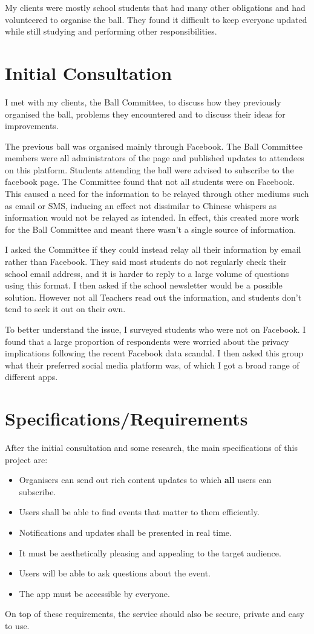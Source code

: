 \documentclass[a4paper,oneside,12pt]{report}
\begin{document}
    My clients were mostly school students that had many other obligations and had volunteered to organise the ball. They found it difficult to keep everyone updated while still studying and performing other responsibilities.

	\section{Initial Consultation}
	I met with my clients, the Ball Committee, to discuss how they previously organised the ball, problems they encountered and to discuss their ideas for improvements.

    The previous ball was organised mainly through Facebook. The Ball Committee members were all administrators of the page and published updates to attendees on this platform. Students attending the ball were advised to subscribe to the facebook page. The Committee found that not all students were on Facebook. This caused a need for the information to be relayed through other mediums such as email or SMS, inducing an effect not dissimilar to Chinese whispers as information would not be relayed as intended. In effect, this created more work for the Ball Committee and meant there wasn't a single source of information.

    I asked the Committee if they could instead relay all their information by email rather than Facebook. They said most students do not regularly check their school email address, and it is harder to reply to a large volume of questions using this format. I then asked if the school newsletter would be a possible solution. However not all Teachers read out the information, and students don't tend to seek it out on their own.

    To better understand the issue, I surveyed students who were not on Facebook. I found that a large proportion of respondents were worried about the privacy implications following the recent Facebook data scandal. I then asked this group what their preferred social media platform was, of which I got a broad range of different apps.

	\section{Specifications/Requirements}
	After the initial consultation and some research, the main specifications of this project are:
	\begin{itemize}
		\item Organisers can send out rich content updates to which \textbf{all} users can subscribe.
		\item Users shall be able to find events that matter to them efficiently.
		\item Notifications and updates shall be presented in real time.
		\item It must be aesthetically pleasing and appealing to the target audience.
		\item Users will be able to ask questions about the event.
		\item The app must be accessible by everyone.
	\end{itemize}
	On top of these requirements, the service should also be secure, private and easy to use.
\end{document}
